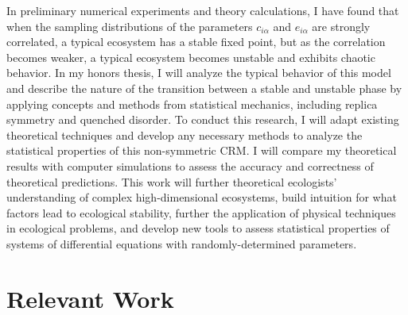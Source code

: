 \documentclass[letterpaper,12pt]{article}
\begin{document}
In preliminary numerical experiments and theory calculations, I have found that when the sampling distributions of the parameters $c_{i\alpha}$ and $e_{i\alpha}$ are strongly correlated, a typical ecosystem has a stable fixed point, but as the correlation becomes weaker, a typical ecosystem becomes unstable and exhibits chaotic behavior.
In my honors thesis, I will analyze the typical behavior of this model and describe the nature of the transition between a stable and unstable phase by applying concepts and methods from statistical mechanics, including replica symmetry and quenched disorder.
To conduct this research, I will adapt existing theoretical techniques and develop any necessary methods to analyze the statistical properties of this non-symmetric CRM.
I will compare my theoretical results with computer simulations to assess the accuracy and correctness of theoretical predictions.
This work will further theoretical ecologists' understanding of complex high-dimensional ecosystems, build intuition for what factors lead to ecological stability, further the application of physical techniques in ecological problems, and develop new tools to assess statistical properties of systems of differential equations with randomly-determined parameters.
\newpage

\section*{Relevant Work}
\end{document}
